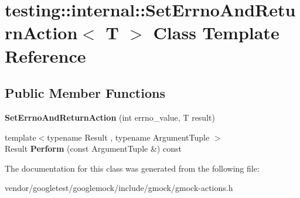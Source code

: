 \hypertarget{classtesting_1_1internal_1_1_set_errno_and_return_action}{}\section{testing\+:\+:internal\+:\+:Set\+Errno\+And\+Return\+Action$<$ T $>$ Class Template Reference}
\label{classtesting_1_1internal_1_1_set_errno_and_return_action}
\subsection*{Public Member Functions}
\begin{DoxyCompactItemize}
\item 
\mbox{\label{classtesting_1_1internal_1_1_set_errno_and_return_action_abfe5a194a9b8f2b303c635ad99b3a257}} 
{\bfseries Set\+Errno\+And\+Return\+Action} (int errno\+\_\+value, T result)
\item 
\mbox{\label{classtesting_1_1internal_1_1_set_errno_and_return_action_a44025d0d124cab72878bf6bdb12c3693}} 
{\footnotesize template$<$typename Result , typename Argument\+Tuple $>$ }\\Result {\bfseries Perform} (const Argument\+Tuple \&) const
\end{DoxyCompactItemize}


The documentation for this class was generated from the following file\+:\begin{DoxyCompactItemize}
\item 
vendor/googletest/googlemock/include/gmock/gmock-\/actions.\+h\end{DoxyCompactItemize}
